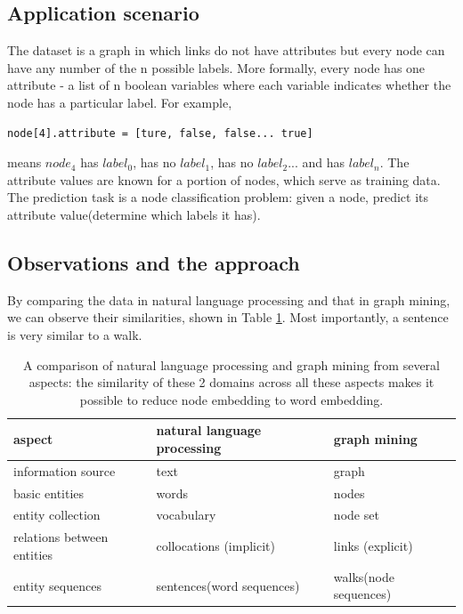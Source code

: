 \documentclass{article}
\begin{document}
\subsection{Application scenario}

The dataset is a graph in which links do not have attributes but every node can have any number of the n possible labels. More formally, every node has one attribute - a list of n boolean variables where each variable indicates whether the node has a particular label. For example,
\begin{lstlisting}
node[4].attribute = [ture, false, false... true]
\end{lstlisting}
means $ node_4 $ has $ label_0 $, has no $ label_1 $, has no $ label_2 $... and has $ label_n $. The attribute values are known for a portion of nodes, which serve as training data. The prediction task is a node classification problem: given a node, predict its attribute value(determine which labels it has).

\subsection{Observations and the approach}

By comparing the data in natural language processing and that in graph mining, we can observe their similarities, shown in Table \ref{tab:word_vs_node}. Most importantly, a sentence is very similar to a walk.

\begin{table}[h]
	\centering
	\begin{tabularx}{\textwidth}{ |X|X|X| } \hline
		aspect  & natural language processing & graph mining \\ \hline
		information source & text & graph \\ \hline
		basic entities & words & nodes \\ \hline
		entity collection & vocabulary & node set \\ \hline
		relations between entities & collocations (implicit) & links (explicit) \\ \hline
		entity sequences & sentences(word sequences) & walks(node sequences) \\ \hline
	\end{tabularx}
	\caption{A comparison of natural language processing and graph mining from several aspects: the similarity of these 2 domains across all these aspects makes it possible to reduce node embedding to word embedding.}
	\label{tab:word_vs_node}
\end{table}
\end{document}
